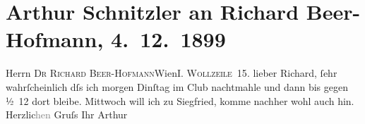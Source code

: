 

         
         \newcommand{\erwaehntePersonen}{Personen: Richard Beer-Hofmann}
         \newcommand{\erwaehnteInstitutionen}{Institutionen: Wiener Schachclub}
         \newcommand{\erwaehnteOrte}{Orte: I., Innere Stadt, Wien, Wollzeile}
         \newcommand{\erwaehnteWerke}{Werke: Siegfried}
               \section[Arthur Schnitzler an Richard Beer-Hofmann, 4. 12. 1899]{ Arthur Schnitzler an Richard Beer-Hofmann,
               4. 12. 1899}\nopagebreak{}\rehead{ }\begin{ledgroupsized}[t]{13cm}\normalsize\beginnumbering \toendnotes[C]{\smallbreak\pagebreak[2]} 
\pstart{}{\pb}Herrn \textsc{Dr Richard
                     Beer-Hofmann}\pend{}\pstart{}Wien\pend{}\pstart{}\textsc{I. Wollzeile 15}.\pend{}{\bigskip}\pstart
           \noindent{}{\pb}lieber Richard, ſehr
               wahrſcheinlich dſs ich morgen Dinſtag im Club nachtmahle und dann bis gegen ½ 12
               dort bleibe.\pend
           \pstart
           Mittwoch will ich zu Siegfried, komme
               nachher wohl auch hin.\pend
           \pstart Herzlic\textcolor{gray}{hen} Gruſs Ihr \spacefill\mbox{Arthur}\pend{}
         
         \endnumbering{}\end{ledgroupsized}  \newcommand{\dateiname}{L01003}\newcommand{\titel}{Arthur Schnitzler an Richard Beer-Hofmann, 4. 12. 1899}\newcommand{\editorInnen}{Martin Anton Müller und Gerd-Hermann Susen}
      